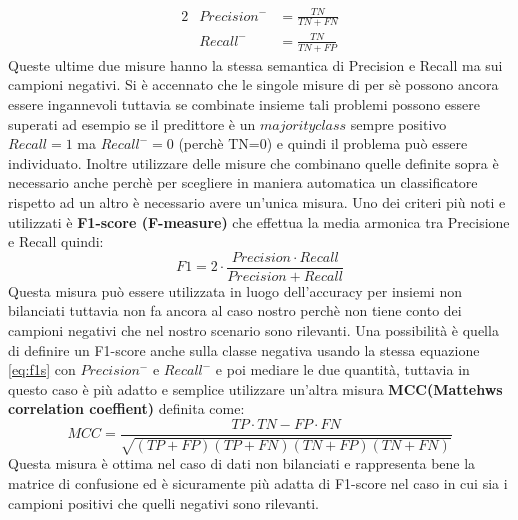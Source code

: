 \begin{alignat*}{2}
& Precision^{-} &= \frac{TN}{TN+FN}\\
& Recall^{-} &=  \frac{TN}{TN+FP}
\end{alignat*} 
Queste ultime due misure hanno la stessa semantica di Precision e Recall ma sui campioni negativi. Si è accennato che le singole misure di per sè possono ancora essere ingannevoli tuttavia se combinate insieme tali problemi possono essere superati ad esempio se il predittore è un $majority class$ sempre positivo $Recall=1$ ma  $Recall^{-}=0$ (perchè TN=0) e quindi il problema può essere individuato. Inoltre utilizzare delle misure che combinano quelle definite sopra è necessario anche perchè per scegliere in maniera automatica un classificatore rispetto ad un altro è necessario avere un'unica misura. Uno dei criteri più noti e utilizzati è \textbf{F1-score (F-measure)} che effettua la media armonica tra Precisione e Recall quindi:
\begin{equation*}
\label{eq:f1s}
F1 = 2 \cdot \frac{Precision \cdot Recall}{Precision + Recall}
\end{equation*}
Questa misura può essere utilizzata in luogo dell'accuracy per insiemi non bilanciati tuttavia non fa ancora al caso nostro perchè non tiene conto dei campioni negativi che nel nostro scenario sono rilevanti. Una possibilità è quella di definire un F1-score anche sulla classe negativa usando la stessa equazione \eqref{eq:f1s} con $Precision^{-}\text{ e } Recall^{-}$ e poi mediare le due quantità, tuttavia in questo caso è più adatto e semplice utilizzare un'altra misura \textbf{MCC(Mattehws correlation coeffient)} definita come:
\begin{equation*}
MCC = \frac{TP \cdot TN−FP \cdot FN}{\sqrt{(TP+FP)(TP+FN)(TN+FP)(TN+FN)}}
 \end{equation*}
 Questa misura è ottima nel caso di dati non bilanciati e rappresenta bene la matrice di confusione ed è sicuramente più adatta di F1-score nel caso in cui sia i campioni positivi che quelli negativi sono rilevanti.